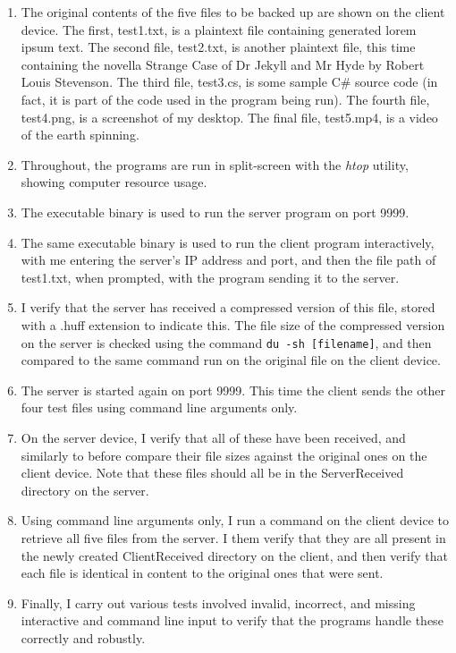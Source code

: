 \documentclass[../main.tex]{subfiles}
\begin{document}
\begin{enumerate}
    \item The original contents of the five files to be backed up are shown on the client device. The first, test1.txt, is a plaintext file containing generated lorem ipsum text. The second file, test2.txt, is another plaintext file, this time containing the novella Strange Case of Dr Jekyll and Mr Hyde by Robert Louis Stevenson. The third file, test3.cs, is some sample C\# source code (in fact, it is part of the code used in the program being run). The fourth file, test4.png, is a screenshot of my desktop. The final file, test5.mp4, is a video of the earth spinning.
    \item Throughout, the programs are run in split-screen with the \textit{htop} utility, showing computer resource usage.
    \item The executable binary is used to run the server program on port 9999.
    \item The same executable binary is used to run the client program interactively, with me entering the server's IP address and port, and then the file path of test1.txt, when prompted, with the program sending it to the server.
    \item I verify that the server has received a compressed version of this file, stored with a .huff extension to indicate this. The file size of the compressed version on the server is checked using the command \texttt{du -sh [filename]}, and then compared to the same command run on the original file on the client device.
    \item The server is started again on port 9999. This time the client sends the other four test files using command line arguments only.
    \item On the server device, I verify that all of these have been received, and similarly to before compare their file sizes against the original ones on the client device. Note that these files should all be in the ServerReceived directory on the server.
    \item Using command line arguments only, I run a command on the client device to retrieve all five files from the server. I them verify that they are all present in the newly created ClientReceived directory on the client, and then verify that each file is identical in content to the original ones that were sent.
    \item Finally, I carry out various tests involved invalid, incorrect, and missing interactive and command line input to verify that the programs handle these correctly and robustly.
\end{enumerate}
\end{document}

